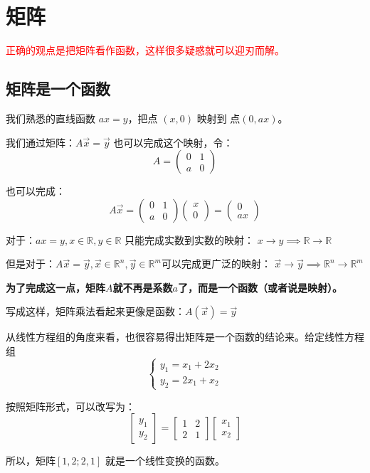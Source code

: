 \documentclass[12pt]{article}
\begin{document}
\section{矩阵\cite{How_To_Understand_Matrix_Multiplication}}
\textcolor{red}{正确的观点是把矩阵看作函数，这样很多疑惑就可以迎刃而解。}

\subsection{矩阵是一个函数}
我们熟悉的直线函数 $ax = y$，把点 $(x,0)$ 映射到 点$(0,ax)$。

我们通过矩阵：$A\vec{x} = \vec{y}$ 也可以完成这个映射，令：
$$
A=
\begin{pmatrix}
0&1\\a&0
\end{pmatrix}
$$

也可以完成：
$$
A\vec{x}=
\begin{pmatrix}
0&1\\a&0
\end{pmatrix}
\begin{pmatrix}
x\\0
\end{pmatrix}
=
\begin{pmatrix}
0\\ax
\end{pmatrix}
$$

对于：$ax=y,x\in\mathbb{R},y\in\mathbb{R}$ 只能完成实数到实数的映射：
$x\to y\implies \mathbb{R}\to\mathbb{R}$

但是对于：$A\vec{x}=\vec{y},\vec{x}\in\mathbb{R}^n,\vec{y}\in\mathbb{R}^m$可以完成更广泛的映射：
$\vec{x}\to \vec{y}\implies \mathbb{R}^n\to\mathbb{R}^m$

\textbf{为了完成这一点，矩阵$A$就不再是系数$a$了，而是一个函数（或者说是映射）。}

写成这样，矩阵乘法看起来更像是函数：$A(\vec{x})=\vec{y}$

\begin{framed}  
\small{
从线性方程组的角度来看，也很容易得出矩阵是一个函数的结论来。给定线性方程组
$$
\begin{cases}
y_1 = x_1 + 2x_2 \\
y_2 = 2x_1 + x_2
\end{cases}
$$

按照矩阵形式，可以改写为：
$$
\begin{bmatrix}
y_1 \\ y_2
\end{bmatrix} = 
\begin{bmatrix}
1 & 2 \\ 2 & 1
\end{bmatrix}
\begin{bmatrix}
x_1 \\ x_2
\end{bmatrix}
$$

所以，矩阵$[1,2;2,1]$ 就是一个线性变换的函数。
}
\end{framed}
\end{document}
